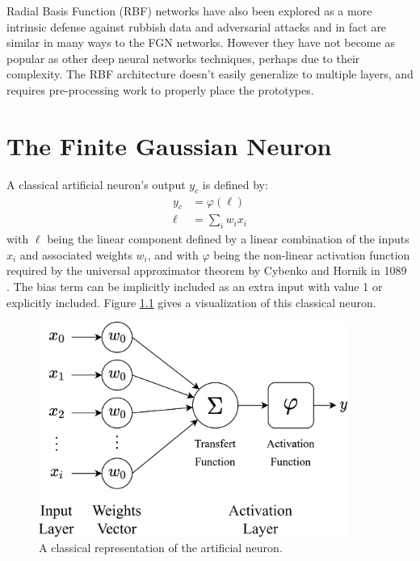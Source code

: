\documentclass[12pt,oneside]{CUNY_PhD}
\begin{document}
Radial Basis Function (RBF) networks have also been explored as a more intrinsic defense against rubbish data and adversarial attacks \cite{moody1989fast, chenou2019radial,zadeh2018deeprbf} and in fact are similar in many ways to the FGN networks. However they have not become as popular as other deep neural networks techniques, perhaps due to their complexity. The RBF architecture doesn't easily generalize to multiple layers, and requires pre-processing work to properly place the prototypes.


\chapter{The Finite Gaussian Neuron}
A classical artificial neuron's output $y_c$ is defined by: 
\begin{align}
y_{c} &= \varphi(\ell) \label{eq:varphi} \\
\ell &= \sum_{i}w_i x_i \label{eq:ell}
\end{align}
with $\ell$ being the linear component defined by a linear combination of the inputs $x_i$ and associated weights $w_i$, and with $\varphi$ being the non-linear activation function required by the universal approximator theorem by Cybenko and Hornik in 1089 \cite{cybenko1989approximation, hornik1989multilayer}. The bias term can be implicitly included as an extra input with value 1 or explicitly included. Figure \ref{fig:classic-neuron} gives a visualization of this classical neuron. 
\begin{figure}[!h]
    \centering
    \includegraphics[width=0.9\textwidth]{images/classic-neuron.png}
    \caption{A classical representation of the artificial neuron.}
    \label{fig:classic-neuron}
\end{figure}
\newline %
\end{document}
